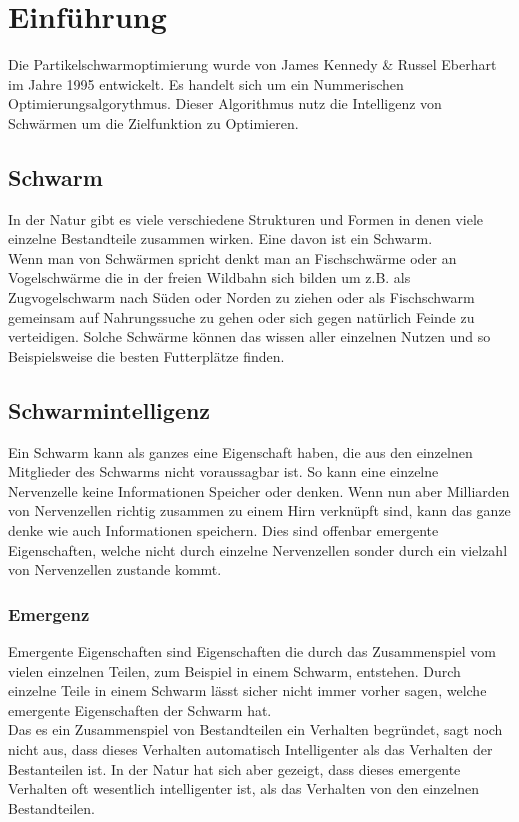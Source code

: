 \section{Einführung}
		Die Partikelschwarmoptimierung wurde von James Kennedy \& Russel Eberhart im Jahre 1995 entwickelt. Es handelt sich um ein Nummerischen Optimierungsalgorythmus. Dieser Algorithmus nutz die Intelligenz von Schwärmen um die Zielfunktion zu Optimieren. \\
		\subsection{Schwarm}
		In der Natur gibt es viele verschiedene Strukturen und Formen in denen viele einzelne Bestandteile zusammen wirken. Eine davon ist ein Schwarm.\\
		Wenn man von Schwärmen spricht denkt man an Fischschwärme oder an Vogelschwärme die in der freien Wildbahn sich bilden um z.B. als Zugvogelschwarm nach Süden oder Norden zu ziehen oder als Fischschwarm gemeinsam auf Nahrungssuche zu gehen oder sich gegen natürlich Feinde zu verteidigen. Solche Schwärme können das wissen aller einzelnen Nutzen und so Beispielsweise die besten Futterplätze finden.\\
		\subsection{Schwarmintelligenz}
		Ein Schwarm kann als ganzes eine Eigenschaft haben, die aus den einzelnen Mitglieder des Schwarms nicht voraussagbar ist. So kann eine einzelne Nervenzelle keine Informationen Speicher oder denken. Wenn nun aber Milliarden von Nervenzellen richtig zusammen zu einem Hirn verknüpft sind, kann das ganze denke wie auch Informationen speichern. Dies sind offenbar emergente Eigenschaften, welche nicht durch einzelne Nervenzellen sonder durch ein vielzahl von Nervenzellen zustande kommt.
		\subsubsection{Emergenz}
		Emergente Eigenschaften sind Eigenschaften die durch das Zusammenspiel vom vielen einzelnen Teilen, zum Beispiel in einem Schwarm, entstehen. Durch einzelne Teile in einem Schwarm lässt sicher nicht immer vorher sagen, welche emergente Eigenschaften der Schwarm hat. \\
		Das es ein Zusammenspiel von Bestandteilen ein Verhalten begründet, sagt noch nicht aus, dass dieses Verhalten automatisch Intelligenter als das Verhalten der Bestanteilen ist. In der Natur hat sich aber gezeigt, dass dieses emergente Verhalten oft wesentlich intelligenter ist, als das Verhalten von den einzelnen Bestandteilen.
